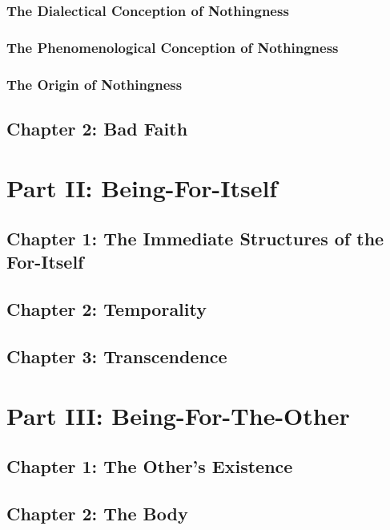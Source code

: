 \subsubsection{The Dialectical Conception of Nothingness}

\subsubsection{The Phenomenological Conception of Nothingness}

\subsubsection{The Origin of Nothingness}

\subsection{Chapter 2: Bad Faith}

\section{Part II: Being-For-Itself}

\subsection{Chapter 1: The Immediate Structures of the For-Itself}

\subsection{Chapter 2: Temporality}

\subsection{Chapter 3: Transcendence}

\section{Part III: Being-For-The-Other}

\subsection{Chapter 1: The Other's Existence}

\subsection{Chapter 2: The Body}

